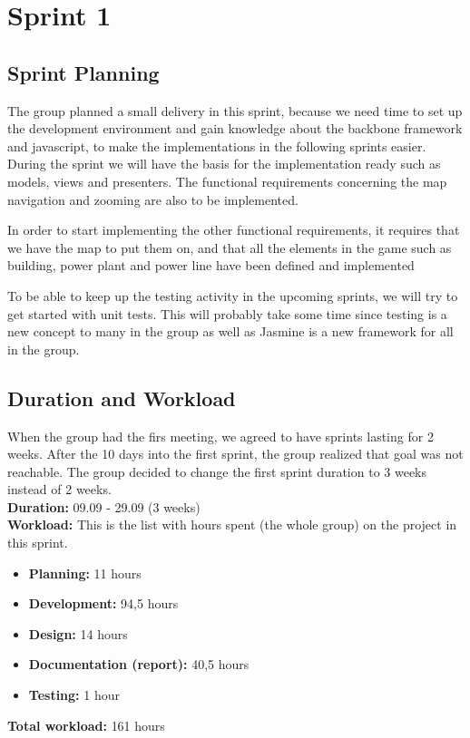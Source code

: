 \section{Sprint 1}

\subsection{Sprint Planning}
	The group planned a small delivery in this sprint, because we need time to set up the development environment and gain knowledge about the backbone framework and javascript, to make the implementations in the following sprints easier. During the sprint we will have the basis for the implementation ready such as models, views and presenters. The functional requirements concerning the map navigation and zooming are also to be implemented.

	In order to start implementing the other functional requirements, it requires that we have the map to put them on, and that all the elements in the game such as building, power plant and power line have been defined and implemented 

	To be able to keep up the testing activity in the upcoming sprints, we will try to get started with unit tests. This will probably take some time since testing is a new concept to many in the group as well as Jasmine is a new framework for all in the group. 

\subsection{Duration and Workload}
	When the group had the firs meeting, we agreed to have sprints lasting for 2 weeks.
	After the 10 days into the first sprint, the group realized that goal was not reachable.
	The group decided to change the first sprint duration to 3 weeks instead of 2 weeks. \\

	{\bf Duration:} 09.09 - 29.09 (3 weeks)\\
	{\bf Workload:} This is the list with hours spent (the whole group) on the project in this sprint.
	\begin{itemize}
		\item {\bf Planning:} 11 hours
		\item {\bf Development:} 94,5 hours
		\item {\bf Design:} 14 hours
		\item {\bf Documentation (report):} 40,5 hours
		\item {\bf Testing:} 1 hour
	\end{itemize}
	{\bf Total workload: } 161 hours \\
	
